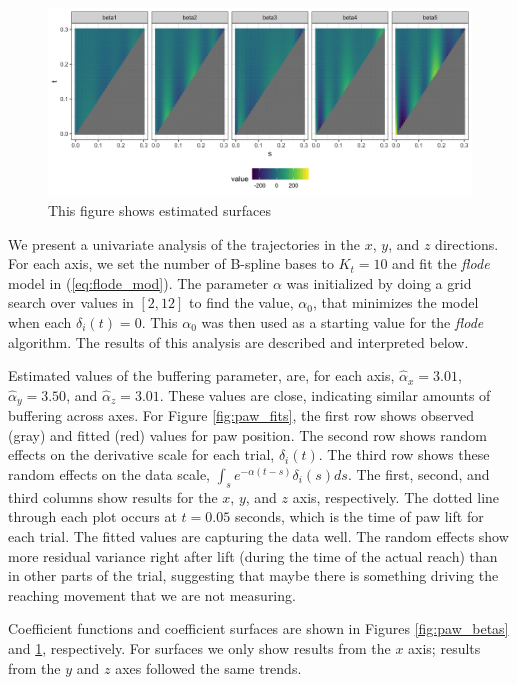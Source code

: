 \documentclass[preprint]{JASA}
\begin{document}
\begin{figure}
\includegraphics[width=\reprintcolumnwidth]{figs/fig_data_surfaces-1} \caption{This figure shows estimated surfaces}\label{fig:paw_surfaces}
\end{figure}

We present a univariate analysis of the trajectories in the \(x\),
\(y\), and \(z\) directions. For each axis, we set the number of
B-spline bases to \(K_t = 10\) and fit the \emph{flode} model in
(\ref{eq:flode_mod}). The parameter \(\alpha\) was initialized by doing
a grid search over values in \([2, 12]\) to find the value,
\(\alpha_0\), that minimizes the model when each \(\delta_i(t) = 0\).
This \(\alpha_0\) was then used as a starting value for the \emph{flode}
algorithm. The results of this analysis are described and interpreted
below.

Estimated values of the buffering parameter, are, for each axis,
\(\widehat{\alpha}_x = 3.01\), \(\widehat{\alpha}_y = 3.50\), and
\(\widehat{\alpha}_z = 3.01\). These values are close, indicating
similar amounts of buffering across axes. For Figure \ref{fig:paw_fits},
the first row shows observed (gray) and fitted (red) values for paw
position. The second row shows random effects on the derivative scale
for each trial, \(\delta_i(t)\). The third row shows these random
effects on the data scale, \(\int_s e^{-\alpha (t-s)}\delta_i(s)ds\).
The first, second, and third columns show results for the \(x\), \(y\),
and \(z\) axis, respectively. The dotted line through each plot occurs
at \(t= 0.05\) seconds, which is the time of paw lift for each trial.
The fitted values are capturing the data well. The random effects show
more residual variance right after lift (during the time of the actual
reach) than in other parts of the trial, suggesting that maybe there is
something driving the reaching movement that we are not measuring.

Coefficient functions and coefficient surfaces are shown in Figures
\ref{fig:paw_betas} and \ref{fig:paw_surfaces}, respectively. For
surfaces we only show results from the \(x\) axis; results from the
\(y\) and \(z\) axes followed the same trends.
\end{document}
